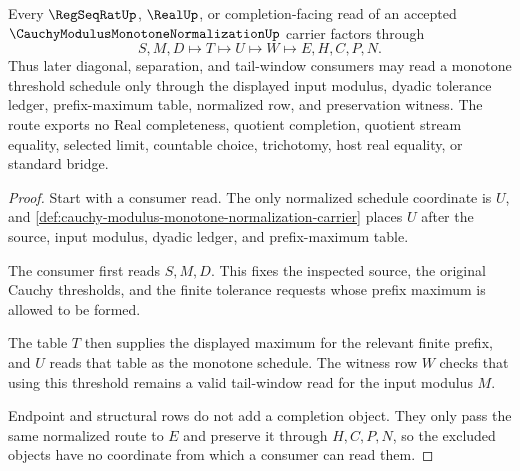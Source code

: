 \begin{theorem}
\label{thm:cauchy-modulus-monotone-normalization-tail-window-handoff}
Every $\RegSeqRatUp$, $\RealUp$, or completion-facing read of an accepted $\CauchyModulusMonotoneNormalizationUp$ carrier factors through
$$
S,M,D \longmapsto T \longmapsto U \longmapsto W \longmapsto E,H,C,P,N .
$$
Thus later diagonal, separation, and tail-window consumers may read a monotone threshold schedule only through the displayed input modulus, dyadic tolerance ledger, prefix-maximum table, normalized row, and preservation witness. The route exports no Real completeness, quotient completion, quotient stream equality, selected limit, countable choice, trichotomy, host real equality, or standard bridge.
\end{theorem}
\begin{proof}
Start with a consumer read. The only normalized schedule coordinate is $U$, and \autoref{def:cauchy-modulus-monotone-normalization-carrier} places $U$ after the source, input modulus, dyadic ledger, and prefix-maximum table.

The consumer first reads $S,M,D$. This fixes the inspected source, the original Cauchy thresholds, and the finite tolerance requests whose prefix maximum is allowed to be formed.

The table $T$ then supplies the displayed maximum for the relevant finite prefix, and $U$ reads that table as the monotone schedule. The witness row $W$ checks that using this threshold remains a valid tail-window read for the input modulus $M$.

Endpoint and structural rows do not add a completion object. They only pass the same normalized route to $E$ and preserve it through $H,C,P,N$, so the excluded objects have no coordinate from which a consumer can read them.
\end{proof}



